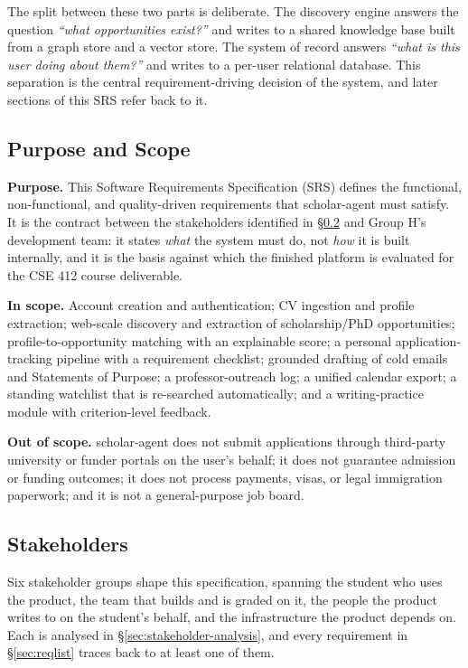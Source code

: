 \documentclass[11pt,a4paper]{article}
\begin{document}
The split between these two parts is deliberate. The discovery engine answers the question
\emph{``what opportunities exist?''} and writes to a shared knowledge base built from a graph
store and a vector store. The system of record answers \emph{``what is this user doing about
them?''} and writes to a per-user relational database. This separation is the central
requirement-driving decision of the system, and later sections of this SRS refer back to it.

\subsection{Purpose and Scope}
\textbf{Purpose.} This Software Requirements Specification (SRS) defines the functional,
non-functional, and quality-driven requirements that scholar-agent must satisfy. It is the
contract between the stakeholders identified in \S\ref{sec:stakeholders} and Group H's
development team: it states \emph{what} the system must do, not \emph{how} it is built
internally, and it is the basis against which the finished platform is evaluated for the
CSE 412 course deliverable.

\textbf{In scope.} Account creation and authentication; CV ingestion and profile extraction;
web-scale discovery and extraction of scholarship/PhD opportunities; profile-to-opportunity
matching with an explainable score; a personal application-tracking pipeline with a
requirement checklist; grounded drafting of cold emails and Statements of Purpose; a
professor-outreach log; a unified calendar export; a standing watchlist that is re-searched
automatically; and a writing-practice module with criterion-level feedback.

\textbf{Out of scope.} scholar-agent does not submit applications through third-party
university or funder portals on the user's behalf; it does not guarantee admission or
funding outcomes; it does not process payments, visas, or legal immigration paperwork; and
it is not a general-purpose job board.

\subsection{Stakeholders}\label{sec:stakeholders}
Six stakeholder groups shape this specification, spanning the student who uses the product,
the team that builds and is graded on it, the people the product writes to on the student's
behalf, and the infrastructure the product depends on. Each is analysed in
\S\ref{sec:stakeholder-analysis}, and every requirement in \S\ref{sec:reqlist} traces back to
at least one of them.
\end{document}
